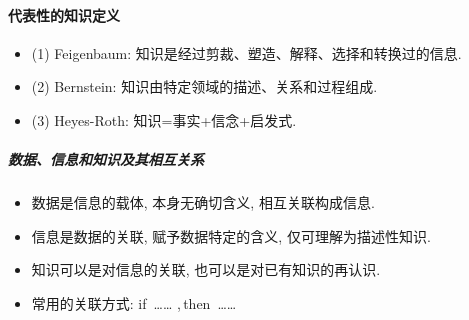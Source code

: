 \paragraph{代表性的知识定义}
\begin{itemize}
\item  (1) Feigenbaum: 知识是经过剪裁、塑造、解释、选择和转换过的信息.
\item  (2) Bernstein: 知识由特定领域的描述、关系和过程组成.
\item  (3) Heyes-Roth: 知识=事实+信念+启发式.
\end{itemize}
\subparagraph{数据、信息和知识及其相互关系}
\begin{itemize}
\item  数据是信息的载体, 本身无确切含义, 相互关联构成信息.
\item  信息是数据的关联, 赋予数据特定的含义, 仅可理解为描述性知识.
\item  知识可以是对信息的关联, 也可以是对已有知识的再认识.
\item  常用的关联方式:  if\, …… ,\,then\, ……\,
\end{itemize}

